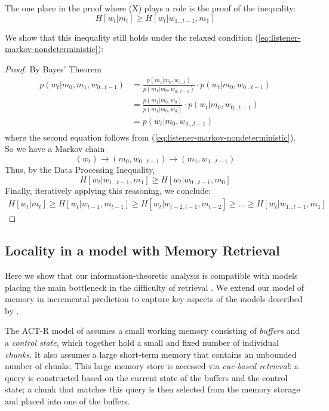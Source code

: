 \documentclass[11pt,letterpaper]{article}
\begin{document}
The one place in the proof where (X) plays a role is the proof of the inequality:
\begin{equation}
	H[w_t | m_t] \geq H[w_t|w_{1 \dots t-1}, m_1]
\end{equation}

We show that this inequality still holds under the relaxed condition (\ref{eq:listener-markov-nondeterministic}):
\begin{proof}
	By Bayes' Theorem
\begin{align*}
	p(w_t|m_0, m_1, w_{0\dots t-1}) &= \frac{p(m_1|m_0, w_{0\dots t})}{p(m_1|m_0, w_{0\dots t-1})} \cdot p(w_t|m_0, w_{0\dots t-1}) \\
 &= \frac{p(m_1|m_0, w_{0})}{p(m_1|m_0, w_{0})} \cdot p(w_t|m_0, w_{0\dots t-1}) \\
 &= p(w_t|m_0, w_{0\dots t-1}) \\
\end{align*}
	where the second equation follows from (\ref{eq:listener-markov-nondeterministic}).
So we have a Markov chain
\begin{equation}
(w_t) \rightarrow (m_0, w_{0 \dots t-1})   \rightarrow   (m_1, w_{1 \dots t-1})
\end{equation}
Thus, by the Data Processing Inequality,
\begin{equation}
H[w_t| w_{1 \dots t-1}, m_{1}] \geq H[w_t|w_{0 \dots t-1}, m_0]
\end{equation}
Finally, iteratively applying this reasoning, we conclude:
\begin{align*}
H[w_t | m_t] \geq H[w_t| w_{t-1}, m_{t-1}] \geq H[w_t| w_{t-2, t-1}, m_{t-2}] \geq ... \geq H[w_t|w_{1 \dots t-1}, m_1]
\end{align*}
\end{proof}


\subsection{Locality in a model with Memory Retrieval}

Here we show that our information-theoretic analysis is compatible with models placing the main bottleneck in the difficulty of retrieval \citep{mcelree2000sentence,lewis-activation-based-2005,nicenboim2018models,vasishth2019computational}.
We extend our model of memory in incremental prediction to capture key aspects of the models described by \citet{lewis-activation-based-2005,nicenboim2018models,vasishth2019computational}.

The ACT-R model of \cite{lewis-activation-based-2005} assumes a small working memory consisting of \emph{buffers} and a \emph{control state}, which together hold a small and fixed number of individual \emph{chunks}.
It also assumes a large short-term memory that contains an unbounded number of chunks.
This large memory store is accessed via \emph{cue-based retrieval}: a query is constructed based on the current state of the buffers and the control state; a chunk that matches this query is then selected from the memory storage and placed into one of the buffers.
\end{document}
